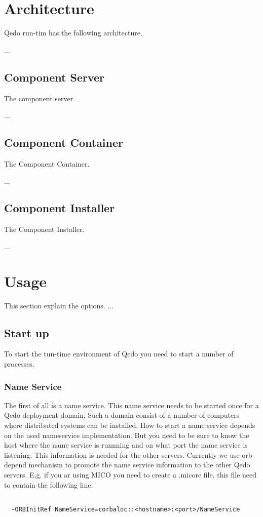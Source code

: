 \documentclass[12pt,a4paper]{report}
\begin{document}
\chapter{Architecture}
\label{sec:Architecture}
Qedo run-tim has the following architecture.

 ...

\section{Component Server}
\label{sec:AComponentServer}
The component server. 

 ... 

\section{Component Container}
\label{sec:ComponentContainer}
The Component Container. 

...

\section{Component Installer}
\label{sec:ComponentInstaller}
The Component Installer.

...

\chapter{Usage}
\label{sec:Usage}
This section explain the options. ...

\section{Start up}
\label{sec:StartUp}
To start the tun-time environment of Qedo you need to start a number of processes. 

\subsection{Name Service}
\label{sec:NameService}

The first of all is a name service. This name service needs to be started once for a Qedo deployment domain. Such a domain consist of a number of computers where distributed systems can be installed. How to start a name service depends on the used nameservice implementation. But you need to be sure to know the host where the name service is runnning and on what port the name service is listening. This information is needed for the other servers. Currently we use orb depend mechanism to promote the name service information to the other Qedo servers. E.g. if you ar using MICO you need to create a .micorc file. this file need to contain the following line:
\small
\begin{verbatim}

  -ORBInitRef NameService=corbaloc::<hostname>:<port>/NameService
  
\end{verbatim}
\normalsize
\end{document}
